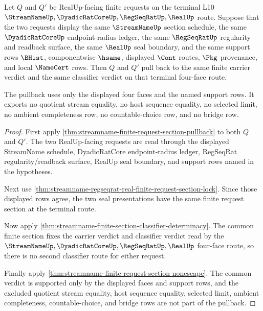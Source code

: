 \begin{theorem}
\label{thm:streamname-finite-request-section-classifier-pullback}
Let $Q$ and $Q'$ be RealUp-facing finite requests on the terminal L10
$\StreamNameUp,\DyadicRatCoreUp,\RegSeqRatUp,\RealUp$ route. Suppose that the
two requests display the same $\StreamNameUp$ section schedule, the same
$\DyadicRatCoreUp$ endpoint-radius ledger, the same $\RegSeqRatUp$
regularity and readback surface, the same $\RealUp$ seal boundary, and the
same support rows $\BHist$, componentwise $\hsame$, displayed $\Cont$ routes,
$\Pkg$ provenance, and local $\NameCert$ rows. Then $Q$ and $Q'$ pull back to
the same finite carrier verdict and the same classifier verdict on that
terminal four-face route.

The pullback uses only the displayed four faces and the named support rows. It
exports no quotient stream equality, no host sequence equality, no selected
limit, no ambient completeness row, no countable-choice row, and no bridge
row.
\end{theorem}
\begin{proof}
First apply \autoref{thm:streamname-finite-request-section-pullback} to both
$Q$ and $Q'$. The two RealUp-facing requests are read through the displayed
StreamName schedule, DyadicRatCore endpoint-radius ledger, RegSeqRat
regularity/readback surface, RealUp seal boundary, and support rows named in
the hypotheses.

Next use \autoref{thm:streamname-regseqrat-real-finite-request-section-lock}.
Since those displayed rows agree, the two seal presentations have the same
finite request section at the terminal route.

Now apply \autoref{thm:streamname-finite-section-classifier-determinacy}. The
common finite section fixes the carrier verdict and classifier verdict read by
the $\StreamNameUp,\DyadicRatCoreUp,\RegSeqRatUp,\RealUp$ four-face route, so
there is no second classifier route for either request.

Finally apply \autoref{thm:streamname-finite-request-section-nonescape}. The
common verdict is supported only by the displayed faces and support rows, and
the excluded quotient stream equality, host sequence equality, selected limit,
ambient completeness, countable-choice, and bridge rows are not part of the
pullback.
\end{proof}

